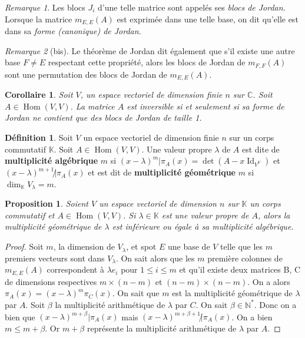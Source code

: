 \documentclass{article}
\DeclareMathOperator{\Id}{Id}
\DeclareMathOperator{\Hom}{Hom}
\newcommand{\N}{\mathbb N}
\newcommand{\C}{\mathbb C}
\newcommand{\K}{\mathbb K}
\newtheorem{prp}[thm]{Proposition}
\newtheorem{cor}[thm]{Corollaire}
\theoremstyle{definition}
\newtheorem{déf}[thm]{Définition}
\theoremstyle{remark}
\newtheorem*{rmq}{Remarque}
\begin{document}
		\begin{rmq} Les blocs $J_i$ d'une telle matrice sont appelés ses \textit{blocs de Jordan}. Lorsque la matrice $m_{E, E}(A)$ est exprimée dans une telle
		base, on dit qu'elle est dans sa \textit{forme (canonique) de Jordan}. \end{rmq}
		
		\begin{rmq}[bis] Le théorème de Jordan dit également que s'il existe une autre base $F \neq E$ respectant cette propriété, alors les blocs de Jordan de
		$m_{F, F}(A)$ sont une permutation des blocs de Jordan de $m_{E, E}(A)$. \end{rmq}

		\begin{cor} Soit $V$, un espace vectoriel de dimension finie $n$ sur $\C$. Soit $A \in \Hom(V, V)$. La matrice $A$ est inversible si et seulement si 
		sa forme de Jordan ne contient que des blocs de Jordan de taille 1. \end{cor}

		\begin{déf} Soit $V$ un espace vectoriel de dimension finie $n$ sur un corps commutatif $\K$. Soit $A \in \Hom(V, V)$. Une valeur propre $\lambda$
		de $A$ est dite de \textbf{multiplicité algébrique} $m$ si $(x-\lambda)^m | \pi_A(x) = \det(A - x\Id_{V^V})$ et $(x-\lambda)^{m+1} \not | \pi_A(x)$
		et est dit de \textbf{multiplicité géométrique} $m$ si $\dim_\K V_\lambda = m$. \end{déf}

		\begin{prp} Soient $V$ un espace vectoriel de dimension $n$ sur $\K$ un corps commutatif et $A \in \Hom(V, V)$. Si $\lambda \in \K$ est une valeur propre
		de $A$, alors la multiplicité géométrique de $\lambda$ est inférieure ou égale à sa multiplicité algébrique. \end{prp}

		\begin{proof} Soit $m$, la dimension de $V_\lambda$, et spot $E$ une base de $V$ telle que les $m$ premiers vecteurs sont dans $V_\lambda$.
		On sait alors que les $m$ première colonnes de $m_{E, E}(A)$ correspondent à $\lambda e_i$ pour $1 \leq i \leq m$ et qu'il existe deux matrices B, C
		de dimensions respectives $m \times (n-m)$ et $(n-m) \times (n-m)$. On a alors $\pi_A(x) = (x-\lambda)^m\pi_C(x)$. On sait que $m$ est la multiplicité
		géométrique de $\lambda$ par $A$. Soit $\beta$ la multiplicité arithmétique de $\lambda$ par $C$. On sait $\beta \in \N^*$. Donc on a bien que
		$(x-\lambda)^{m+\beta} | \pi_A(x)$ mais $(x-\lambda)^{m+\beta+1} \not | \pi_A(x)$. On a bien $m \leq m + \beta$. Or $m + \beta$ représente la multiplicité
		arithmétique de $\lambda$ par $A$. \end{proof}
\end{document}
